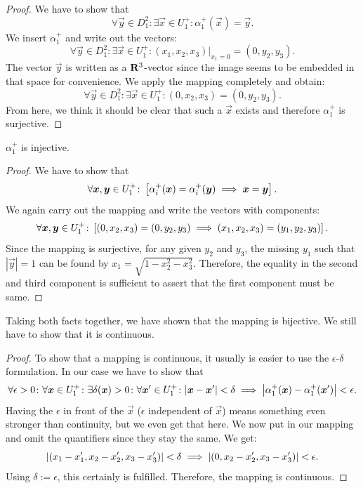 \documentclass[11pt, english, fleqn, DIV=15, headinclude, BCOR=1cm]{scrartcl}
\begin{document}
\begin{proof}
    We have to show that
    \[
        \forall \vec y \in D_1^2 \colon \exists \vec x \in U_1^+ \colon
        \alpha_1^+(\vec x) = \vec y.
    \]
    We insert $\alpha_1^+$ and write out the vectors:
    \[
        \forall \vec y \in D_1^2 \colon \exists \vec x \in U_1^+ \colon
        (x_1, x_2, x_3)|_{x_1 = 0} = (0, y_2, y_3).
    \]
    The vector $\vec y$ is written as a $\mathbf R^3$-vector since the image seems to
    be embedded in that space for convenience. We apply the mapping completely
    and obtain:
    \[
        \forall \vec y \in D_1^2 \colon \exists \vec x \in U_1^+ \colon
        (0, x_2, x_3) = (0, y_2, y_3).
    \]
    From here, we think it should be clear that such a $\vec x$ exists and
    therefore $\alpha_1^+$ is surjective.
\end{proof}

$\alpha_1^+$ is injective.

\begin{proof}
    We have to show that
    \[
        \forall \boldsymbol{x}, \boldsymbol{y} \in U_1^+ \colon \left[ 
            \alpha_i^+(\boldsymbol{x}) = \alpha_i^+(\boldsymbol{y})
            \implies
            \boldsymbol{x} = \boldsymbol{y}
         \right].
    \]
    We again carry out the mapping and write the vectors with components:
    \[
        \forall \boldsymbol{x}, \boldsymbol{y} \in U_1^+ \colon \left[ 
            (0, x_2, x_3) = (0, y_2, y_3)
            \implies
            (x_1, x_2, x_3) = (y_1, y_2, y_3)
         \right].
    \]
    Since the mapping is surjective, for any given $y_2$ and $y_3$, the missing
    $y_1$ such that $|\vec y| = 1$ can be found by $x_1 = \sqrt{1 - x_2^2 -
    x_3^2}$. Therefore, the equality in the second and third component is
    sufficient to assert that the first component must be same.
\end{proof}

Taking both facts together, we have shown that the mapping is bijective. We
still have to show that it is continuous.

\begin{proof}
    To show that a mapping is continuous, it usually is easier to use the
    $\epsilon$-$\delta$ formulation. In our case we have to show that
    \[
        \forall \epsilon > 0 \colon
        \forall \boldsymbol{x} \in U_1^+ \colon
        \exists \delta(\boldsymbol{x}) > 0 \colon
        \forall \boldsymbol{x}' \in U_1^+ \colon
        |\boldsymbol{x} - \boldsymbol{x}'| < \delta
        \implies
        \left| \alpha_1^+(\boldsymbol{x}) - \alpha_1^+(\boldsymbol{x}') \right| < \epsilon.
    \]
    Having the $\epsilon$ in front of the $\vec x$ ($\epsilon$ independent of
    $\vec x$) means something even stronger than continuity, but we even get
    that here. We now put in our mapping and omit the quantifiers since they
    stay the same. We get:
    \[
        \left| (x_1 - x_1', x_2 - x_2', x_3 - x_3') \right| < \delta
        \implies
        \left| (0, x_2 - x_2', x_3 - x_3') \right| < \epsilon.
    \]
    Using $\delta := \epsilon$, this certainly is fulfilled. Therefore, the
    mapping is continuous.
\end{proof}
\end{document}
